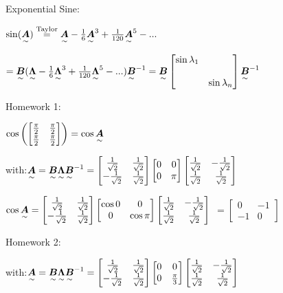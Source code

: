 Exponential Sine: 

$\sin(\underset{\sim}{\boldsymbol {A}})\overset{\textrm{Taylor}}{=}\underset{\sim}{\boldsymbol {A}}-\frac{1}{6}\underset{\sim}{\boldsymbol {A}}^3+\frac{1}{120}\underset{\sim}{\boldsymbol {A}}^5-...$

$=\underset{\sim}{\boldsymbol {B}}(\underset{\sim}{\boldsymbol {\Lambda}}-\frac{1}{6}\underset{\sim}{\boldsymbol {\Lambda}}^3+\frac{1}{120}\underset{\sim}{\boldsymbol {\Lambda}}^5-...)\underset{\sim}{\boldsymbol {B}}^{-1}
=\underset{\sim}{\boldsymbol {B}} \begin{bmatrix}\sin\lambda_1 & \\ \\ &\sin\lambda_n\end{bmatrix} \underset{\sim}{\boldsymbol {B}}^{-1}$


Homework 1: 

$\cos\left(\begin{bmatrix}\frac{\pi}{2}&\frac{\pi}{2}\\\frac{\pi}{2}&\frac{\pi}{2}\end{bmatrix}\right)=\cos\underset{\sim}{\boldsymbol {A}}$

with:$\underset{\sim}{\boldsymbol {A}}=\underset{\sim}{\boldsymbol {B}}\underset{\sim}{\boldsymbol {\Lambda}}\underset{\sim}{\boldsymbol {B}}^{-1}
=\begin{bmatrix}\frac{1}{\sqrt{2}}&\frac{1}{\sqrt{2}}\\-\frac{1}{\sqrt{2}}&\frac{1}{\sqrt{2}}\end{bmatrix}
\begin{bmatrix}0&0\\0&\pi\end{bmatrix}
\begin{bmatrix}\frac{1}{\sqrt{2}}&-\frac{1}{\sqrt{2}}\\\frac{1}{\sqrt{2}}&\frac{1}{\sqrt{2}}\end{bmatrix}
$

$\cos\underset{\sim}{\boldsymbol {A}}=\begin{bmatrix}\frac{1}{\sqrt{2}}&\frac{1}{\sqrt{2}}\\-\frac{1}{\sqrt{2}}&\frac{1}{\sqrt{2}}\end{bmatrix}
\begin{bmatrix}\cos 0&0\\0&\cos \pi\end{bmatrix}
\begin{bmatrix}\frac{1}{\sqrt{2}}&-\frac{1}{\sqrt{2}}\\\frac{1}{\sqrt{2}}&\frac{1}{\sqrt{2}}\end{bmatrix}$
$=\begin{bmatrix}0&-1\\-1&0\end{bmatrix} $

Homework 2:

with:$\underset{\sim}{\boldsymbol {A}}=\underset{\sim}{\boldsymbol {B}}\underset{\sim}{\boldsymbol {\Lambda}}\underset{\sim}{\boldsymbol {B}}^{-1}
=\begin{bmatrix}\frac{1}{\sqrt{2}}&\frac{1}{\sqrt{2}}\\-\frac{1}{\sqrt{2}}&\frac{1}{\sqrt{2}}\end{bmatrix}
\begin{bmatrix}0&0\\0&\frac{\pi}{3}\end{bmatrix}
\begin{bmatrix}\frac{1}{\sqrt{2}}&-\frac{1}{\sqrt{2}}\\\frac{1}{\sqrt{2}}&\frac{1}{\sqrt{2}}\end{bmatrix}
$

